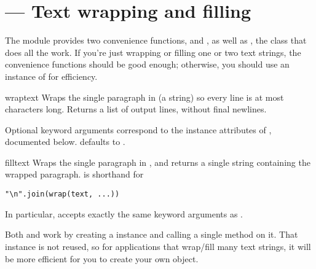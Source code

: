 \section{ ---
         Text wrapping and filling}



The  module provides two convenience functions,
 and , as well as
, the class that does all the work.  If you're just
wrapping or filling one or two text strings, the convenience functions
should be good enough; otherwise, you should use an instance of
 for efficiency.

\begin{funcdesc}{wrap}{text}
Wraps the single paragraph in  (a string) so every line is at
most  characters long.  Returns a list of output lines,
without final newlines.

Optional keyword arguments correspond to the instance attributes of
, documented below.   defaults to
.
\end{funcdesc}

\begin{funcdesc}{fill}{text}
Wraps the single paragraph in , and returns a single string
containing the wrapped paragraph.   is shorthand for
\begin{verbatim}
"\n".join(wrap(text, ...))
\end{verbatim}

In particular,  accepts exactly the same keyword
arguments as .
\end{funcdesc}

Both  and  work by creating a
 instance and calling a single method on it.  That
instance is not reused, so for applications that wrap/fill many text
strings, it will be more efficient for you to create your own
 object.

